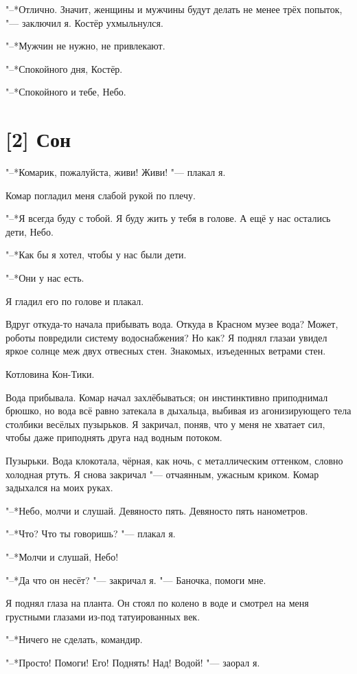 "--*Отлично.
Значит, женщины и мужчины будут делать не менее трёх попыток, "--- заключил я.
Костёр ухмыльнулся.

"--*Мужчин не нужно, не привлекают.

"--*Спокойного дня, Костёр.

"--*Спокойного и тебе, Небо.

\section{[2] Сон}

"--*Комарик, пожалуйста, живи!
Живи! "--- плакал я.

Комар погладил меня слабой рукой по плечу.

"--*Я всегда буду с тобой.
Я буду жить у тебя в голове.
А ещё у нас остались дети, Небо.

"--*Как бы я хотел, чтобы у нас были дети.

"--*Они у нас есть.

Я гладил его по голове и плакал.

Вдруг откуда-то начала прибывать вода.
Откуда в Красном музее вода?
Может, роботы повредили систему водоснабжения?
Но как?
Я поднял глаза\ldotst и увидел яркое солнце меж двух отвесных стен.
Знакомых, изъеденных ветрами стен.

Котловина Кон-Тики.

Вода прибывала.
Комар начал захлёбываться;
он инстинктивно приподнимал брюшко, но вода всё равно затекала в дыхальца, выбивая из агонизирующего тела столбики весёлых пузырьков.
Я закричал, поняв, что у меня не хватает сил, чтобы даже приподнять друга над водным потоком.

Пузырьки.
Вода клокотала, чёрная, как ночь, с металлическим оттенком, словно холодная ртуть.
Я снова закричал "--- отчаянным, ужасным криком.
Комар задыхался на моих руках.

"--*Небо, молчи и слушай.
Девяносто пять.
Девяносто пять нанометров.

"--*Что?
Что ты говоришь? "--- плакал я.

"--*Молчи и слушай, Небо!

"--*Да что он несёт? "--- закричал я.
"--- Баночка, помоги мне.

Я поднял глаза на планта.
Он стоял по колено в воде и смотрел на меня грустными глазами из-под татуированных век.

"--*Ничего не сделать, командир.

"--*Просто! Помоги! Его! Поднять! Над! Водой! "--- заорал я.

